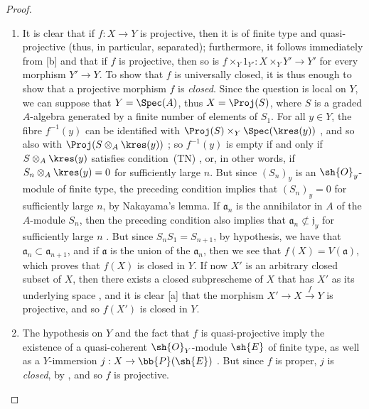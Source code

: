 \begin{proof}
\medskip\noindent
\begin{enumerate}
  \item[(i)] It is clear that if $f:X\to Y$ is projective, then it is of finite type and quasi-projective (thus, in particular, separated); furthermore, it follows immediately from [b] and  that if $f$ is projective, then so is $f\times_Y 1_{Y'}:X\times_Y Y'\to Y'$ for every morphism $Y'\to Y$.
     To show that $f$ is universally closed, it is thus enough to show that a projective morphism $f$ is \emph{closed}.
     Since the question is local on $Y$, we can suppose that $Y=\Spec(A)$, thus  $X=\Proj(S)$, where $S$ is a graded $A$-algebra generated by a finite number of elements of $S_1$.
     For all $y\in Y$, the fibre $f^{-1}(y)$ can be identified with $\Proj(S)\times_Y\Spec(\kres(y))$ , and so also with $\Proj(S\otimes_A\kres(y))$ ;
     so $f^{-1}(y)$ is empty if and only if $S\otimes_A\kres(y)$ satisfies condition~(TN) , or, in other words, if $S_n\otimes_A\kres(y)=0$ for sufficiently large $n$.
     But since $(S_n)_y$ is an $\sh{O}_y$-module of finite type, the preceding condition implies that $(S_n)_y=0$ for sufficiently large $n$, by Nakayama's lemma.
     If $\mathfrak{a}_n$ is the annihilator in $A$ of the $A$-module $S_n$, then the preceding condition also implies that $\mathfrak{a}_n\not\subset\mathfrak{j}_y$ for sufficiently large $n$ .
     But since $S_nS_1=S_{n+1}$, by hypothesis, we have that $\mathfrak{a}_n\subset\mathfrak{a}_{n+1}$, and if $\mathfrak{a}$ is the union of the $\mathfrak{a}_n$, then we see that $f(X)=V(\mathfrak{a})$, which proves that $f(X)$ is closed in $Y$.
     If now $X'$ is an arbitrary closed subset of $X$, then there exists a closed subprescheme of $X$ that has $X'$ as its underlying space , and it is clear [a] that the morphism $X'\to X\xrightarrow{f}Y$ is projective, and so $f(X')$ is closed in $Y$.
   \item[(ii)] The hypothesis on $Y$ and the fact that $f$ is quasi-projective imply the existence of a quasi-coherent $\sh{O}_Y$-module $\sh{E}$ of finite type, as well as a $Y$-immersion $j:X\to\bb{P}(\sh{E})$ .
      But since $f$ is proper, $j$ is \emph{closed}, by , and so $f$ is projective.
\end{enumerate}
\end{proof}

